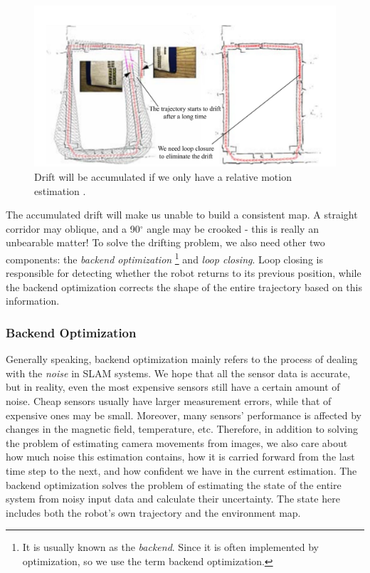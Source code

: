 \begin{figure}
    \centering
    \includegraphics[width=1.0\textwidth]{./resources/whatIsSLAM/loopclosure.pdf}
    \caption{Drift will be accumulated if we only have a relative motion estimation \cite{Ho2007}.}
    \label{fig:loopclosure}
\end{figure}

The accumulated drift will make us unable to build a consistent map. A straight corridor may oblique, and a 90$^\circ$ angle may be crooked - this is really an unbearable matter! To solve the drifting problem, we also need other two components: the \textit{backend optimization} \footnote{It is usually known as the \textit{backend}. Since it is often implemented by optimization, so we use the term backend optimization.} and \textit{loop closing}. Loop closing is responsible for detecting whether the robot returns to its previous position, while the backend optimization corrects the shape of the entire trajectory based on this information.

\subsubsection{Backend Optimization}
Generally speaking, backend optimization mainly refers to the process of dealing with the \emph{noise} in SLAM systems. We hope that all the sensor data is accurate, but in reality, even the most expensive sensors still have a certain amount of noise. Cheap sensors usually have larger measurement errors, while that of expensive ones may be small. Moreover, many sensors' performance is affected by changes in the magnetic field, temperature, etc. Therefore, in addition to solving the problem of estimating camera movements from images, we also care about how much noise this estimation contains, how it is carried forward from the last time step to the next, and how confident we have in the current estimation. The backend optimization solves the problem of estimating the state of the entire system from noisy input data and calculate their uncertainty. The state here includes both the robot's own trajectory and the environment map.

